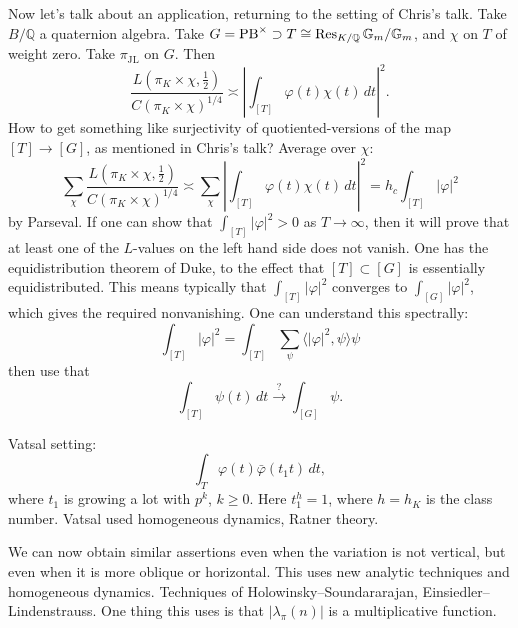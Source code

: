\documentclass[reqno]{amsart} 
\begin{document}
Now let's talk about an application, returning to the setting of Chris's talk.  Take $B/\mathbb{Q}$ a quaternion algebra.  Take $G = \operatorname{PB}^\times \supset T \cong \operatorname{Res}_{K / \mathbb{Q} } \mathbb{G}_m / \mathbb{G}_m $, and $\chi$ on $T$ of weight zero.  Take $\pi_{\mathrm{JL}}$ on $G$.  Then
\begin{equation*}
  \frac{L(\pi_K \times \chi, \tfrac{1}{2} )}{ C(\pi_K \times \chi)^{1/4}}
  \asymp \left\lvert \int_{[T]} \varphi(t) \chi(t) \, d t \right\rvert^2.
\end{equation*}
How to get something like surjectivity of quotiented-versions of the map $[T] \rightarrow [G]$, as mentioned in Chris's talk?  Average over $\chi$:
\begin{equation*}
  \sum_\chi
  \frac{L(\pi_K \times \chi, \tfrac{1}{2} )}{ C(\pi_K \times \chi)^{1/4}}
  \asymp
  \sum_\chi 
  \left\lvert \int_{[T]} \varphi(t) \chi(t) \, d t \right\rvert^2
  = h_c \int_{[T]} \lvert \varphi \rvert^2
\end{equation*}
by Parseval.  If one can show that $\int_{[T]} \lvert \varphi \rvert^2 > 0$ as $T \rightarrow \infty$, then it will prove that at least one of the $L$-values on the left hand side does not vanish.  One has the equidistribution theorem of Duke, to the effect that $[T] \subset [G]$ is essentially equidistributed.  This means typically that $\int_{[T]} \lvert \varphi \rvert^2$ converges to $\int_{[G]} \lvert \varphi  \rvert^2$, which gives the required nonvanishing.  One can understand this spectrally:
\begin{equation*}
  \int_{[T]} \lvert \varphi  \rvert^2 = \int_{[T]} \sum_\psi \langle \lvert \varphi  \rvert^2, \psi \rangle \psi
\end{equation*}
then use that
\begin{equation*}
 \int_{[T]} \psi(t) \, d t \xrightarrow{?} \int_{[G]} \psi.
\end{equation*}

Vatsal setting:
\begin{equation*}
  \int_T \varphi(t) \bar{\varphi}(t_1 t) \, d t,
\end{equation*}
where $t_1$ is growing a lot with $p^k $, $k \geq 0$.  Here $t_1^h = 1$, where $h = h_K$ is the class number.  Vatsal used homogeneous dynamics, Ratner theory.

We can now obtain similar assertions even when the variation is not vertical, but even when it is more oblique or horizontal.  This uses new analytic techniques and homogeneous dynamics.  Techniques of Holowinsky--Soundararajan, Einsiedler--Lindenstrauss.  One thing this uses is that $\lvert \lambda_\pi(n) \rvert$ is a multiplicative function.
\end{document}
